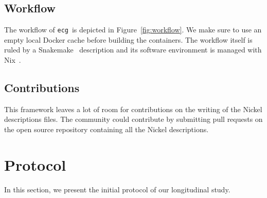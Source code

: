 \documentclass[sigconf,natbib=false]{acmart}
\newcommand{\df}{\texttt{Dockerfile}}
\newcommand{\ecg}{\texttt{ecg}}
\begin{document}
\subsection{Workflow}\label{sec:workflow}

\begin{figure*}
  \centering
  \caption{
    Workflow of \ecg.
    Each description of an artifact is verified with the Nickel contract and then converted in a JSON representation.
    This JSON representation is then read by \ecg\ to
    \textit{(i)} download the artifact,
    \textit{(ii)} compute the hash of its content,
    \textit{(iii)} build the container from the \df, and
    \textit{(iv)} extract the software environment information from the built container.
    \ecg\ outputs files containing the information about the artifact and its \df\ .
  }
  \label{fig:workflow}
\end{figure*}

The workflow of \ecg\ is depicted in Figure~\ref{fig:workflow}.
We make sure to use an empty local Docker cache before building the containers.
The workflow itself is ruled by a Snakemake~\cite{koster2012snakemake} description and its software environment is managed with Nix~\cite{dolstra_nix_2004}.

\subsection{Contributions}

This framework leaves a lot of room for contributions on the writing of the Nickel descriptions files.
The community could contribute by submitting pull requests on the open source repository containing all the Nickel descriptions.

\section{Protocol}\label{sec:protocol}

In this section, we present the initial protocol of our longitudinal study.
\end{document}
